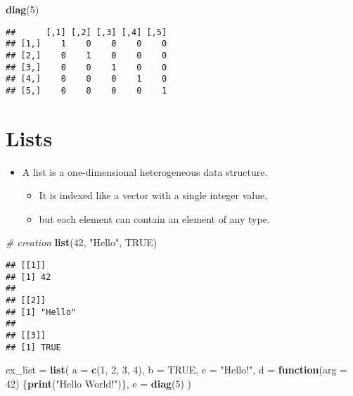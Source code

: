 \documentclass[]{book}
\newenvironment{Shaded}{\begin{snugshade}}{\end{snugshade}}
\newcommand{\KeywordTok}[1]{\textcolor[rgb]{0.13,0.29,0.53}{\textbf{#1}}}
\newcommand{\DataTypeTok}[1]{\textcolor[rgb]{0.13,0.29,0.53}{#1}}
\newcommand{\DecValTok}[1]{\textcolor[rgb]{0.00,0.00,0.81}{#1}}
\newcommand{\StringTok}[1]{\textcolor[rgb]{0.31,0.60,0.02}{#1}}
\newcommand{\CommentTok}[1]{\textcolor[rgb]{0.56,0.35,0.01}{\textit{#1}}}
\newcommand{\OtherTok}[1]{\textcolor[rgb]{0.56,0.35,0.01}{#1}}
\newcommand{\ControlFlowTok}[1]{\textcolor[rgb]{0.13,0.29,0.53}{\textbf{#1}}}
\newcommand{\NormalTok}[1]{#1}
\providecommand{\tightlist}{%
  \setlength{\itemsep}{0pt}\setlength{\parskip}{0pt}}
\begin{document}
\begin{Shaded}
\begin{Highlighting}[]
\KeywordTok{diag}\NormalTok{(}\DecValTok{5}\NormalTok{)}
\end{Highlighting}
\end{Shaded}

\begin{verbatim}
##      [,1] [,2] [,3] [,4] [,5]
## [1,]    1    0    0    0    0
## [2,]    0    1    0    0    0
## [3,]    0    0    1    0    0
## [4,]    0    0    0    1    0
## [5,]    0    0    0    0    1
\end{verbatim}

\section{Lists}\label{lists}

\begin{itemize}
\tightlist
\item
  A list is a one-dimensional heterogeneous data structure.

  \begin{itemize}
  \tightlist
  \item
    It is indexed like a vector with a single integer value,
  \item
    but each element can contain an element of any type.
  \end{itemize}
\end{itemize}

\begin{Shaded}
\begin{Highlighting}[]
\CommentTok{# creation}
\KeywordTok{list}\NormalTok{(}\DecValTok{42}\NormalTok{, }\StringTok{"Hello"}\NormalTok{, }\OtherTok{TRUE}\NormalTok{)}
\end{Highlighting}
\end{Shaded}

\begin{verbatim}
## [[1]]
## [1] 42
## 
## [[2]]
## [1] "Hello"
## 
## [[3]]
## [1] TRUE
\end{verbatim}

\begin{Shaded}
\begin{Highlighting}[]
\NormalTok{ex_list =}\StringTok{ }\KeywordTok{list}\NormalTok{(}
  \DataTypeTok{a =} \KeywordTok{c}\NormalTok{(}\DecValTok{1}\NormalTok{, }\DecValTok{2}\NormalTok{, }\DecValTok{3}\NormalTok{, }\DecValTok{4}\NormalTok{),}
  \DataTypeTok{b =} \OtherTok{TRUE}\NormalTok{,}
  \DataTypeTok{c =} \StringTok{"Hello!"}\NormalTok{,}
  \DataTypeTok{d =} \ControlFlowTok{function}\NormalTok{(}\DataTypeTok{arg =} \DecValTok{42}\NormalTok{) \{}\KeywordTok{print}\NormalTok{(}\StringTok{"Hello World!"}\NormalTok{)\},}
  \DataTypeTok{e =} \KeywordTok{diag}\NormalTok{(}\DecValTok{5}\NormalTok{)}
\NormalTok{)}
\end{Highlighting}
\end{Shaded}
\end{document}
